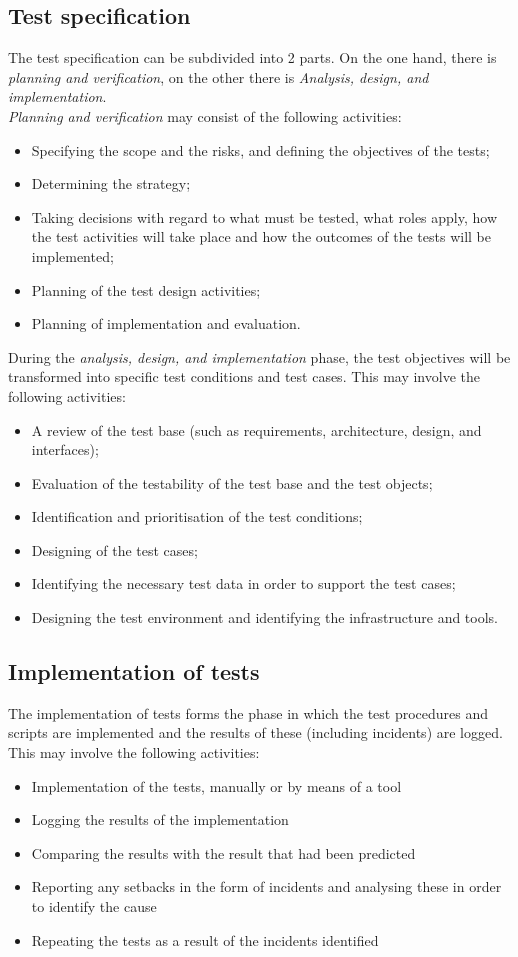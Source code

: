 \documentclass[12pt]{article}
\begin{document}
\subsection{Test specification}
The test specification can be subdivided into 2 parts. On the one hand, there is \textit{planning and verification}, on the other there is \textit{Analysis, design, and implementation}.\\
\indent \textit{Planning and verification} may consist of the following activities:\\
\begin{itemize}
 \item Specifying the scope and the risks, and defining the objectives of the tests;
\item Determining the strategy;
\item Taking decisions with regard to what must be tested, what roles apply, how the test activities will take place and how the outcomes of the tests will be implemented;
\item Planning of the test design activities;
\item Planning of implementation and evaluation.
\end{itemize}
During the \textit{analysis, design, and implementation} phase, the test objectives will be transformed into specific test conditions and test cases. This may involve the following activities: \newline
\begin{itemize}
 \item A review of the test base (such as requirements, architecture, design, and interfaces);
\item Evaluation of the testability of the test base and the test objects;
\item Identification and prioritisation of the test conditions;
\item Designing of the test cases;
\item Identifying the necessary test data in order to support the test cases;
\item Designing the test environment and identifying the infrastructure and tools.
\end{itemize}
\subsection{Implementation of tests}
The implementation of tests forms the phase in which the test procedures and scripts are implemented and the results of these (including incidents) are logged. This may involve the following activities: \newline
\begin{itemize}
 \item Implementation of the tests, manually or by means of a tool  
\item Logging the results of the implementation 
\item Comparing the results with the result that had been predicted 
\item Reporting any setbacks in the form of incidents and analysing these in order to identify the cause 
\item Repeating the tests as a result of the incidents identified 
\end{itemize}
\end{document}
